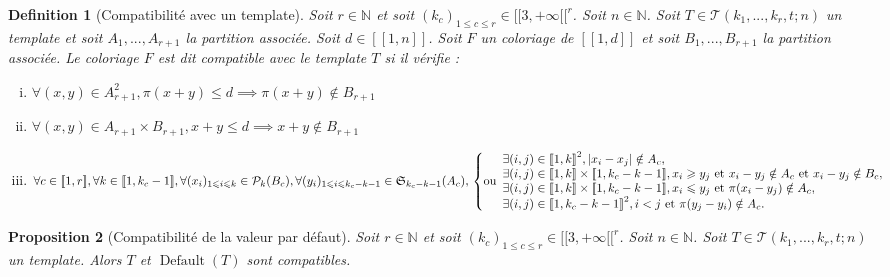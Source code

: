 \documentclass{article}
\newtheorem{definition}{Definition}[section]
\newtheorem{proposition}[definition]{Proposition}
\DeclareMathOperator{\coldef}{Default}
\begin{document}
\begin{definition}[Compatibilité avec un template]
Soit \(r \in \mathbb{N}\) et soit \((k_c)_{1 \leqslant c \leqslant r}  \in {[\![3, +\infty[\![}^r\). Soit \(n \in \mathbb{N}\). Soit \(T \in \mathcal{T}(k_1, ..., k_r, t; n)\) un template et soit \(A_1, ..., A_{r+1}\) la partition associée. Soit \(d \in [\![1, n]\!]\). Soit \(F\) un coloriage de \([\![1, d]\!]\) et soit \(B_1, ..., B_{r+1}\) la partition associée. Le coloriage \(F\) est dit compatible avec le template \(T\) si il vérifie :
\begin{enumerate}[(i)]
\item \(\forall (x,y) \in A_{r+1}^2, \pi(x + y) \leqslant d \implies \pi(x + y)  \notin B_{r+1}\)
\item \(\forall (x,y) \in A_{r+1} \times B_{r+1}, x + y \leqslant d \implies x + y  \notin B_{r+1}\)
\item \(\forall c \in [\![1, r]\!], \forall k \in [\![1, k_c-1]\!], \forall (x_i)_{1 \leqslant i \leqslant k} \in\mathcal{P}_k(B_c), \forall (y_i)_{1 \leqslant i \leqslant k_c - k - 1} \in \mathfrak{S}_{k_c - k - 1}(A_c), \\
	\left\{ \text{ou} 
	\begin{array}{l}
		\exists (i, j) \in {[\![1, k]\!]}^2, |x_i - x_j| \notin A_c, \\
		\exists (i, j) \in [\![1, k]\!] \times [\![1, k_c - k - 1]\!], x_i \geqslant y_j  ~\text{et}~ x_i - y_j \notin A_c ~\text{et}~  x_i - y_j  \notin B_c, \\
		\exists (i, j) \in [\![1, k]\!] \times [\![1, k_c - k - 1]\!], x_i \leqslant y_j  ~\text{et}~ \pi(x_i - y_j) \notin A_c, \\
		\exists (i, j) \in {[\![1, k_c - k - 1]\!]}^2, i < j ~\text{et}~ \pi(y_j - y_i) \notin A_c.
	\end{array}
	\right.\)
\end{enumerate}
\end{definition}

\begin{proposition}[Compatibilité de la valeur par défaut]
Soit \(r \in \mathbb{N}\) et soit \((k_c)_{1 \leqslant c \leqslant r}  \in {[\![3, +\infty[\![}^r\). Soit \(n \in \mathbb{N}\). Soit \(T \in \mathcal{T}(k_1, ..., k_r, t; n)\) un template. Alors \(T\) et \(\coldef(T)\) sont compatibles.
\end{proposition}
\end{document}
